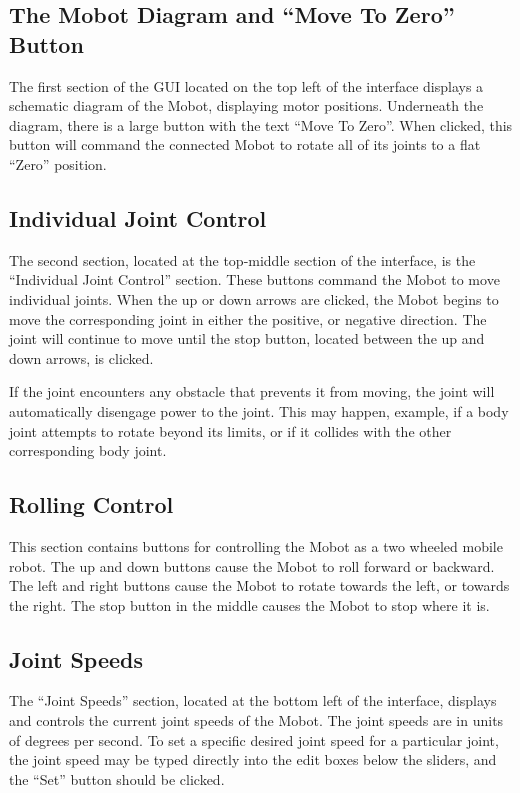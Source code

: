 \documentclass{article}
\begin{document}
\subsection{The Mobot Diagram and ``Move To Zero'' Button}
The first section of the GUI located on the top left of the interface
displays a schematic diagram of the Mobot, displaying motor positions.
Underneath the diagram, there is a large button with the text 
``Move To Zero''. When clicked, this button will command the connected
Mobot to rotate all of its joints to a flat ``Zero'' position.

\subsection{Individual Joint Control}
The second section, located at the top-middle section of the interface,
is the ``Individual Joint Control'' section. These buttons command the
Mobot to move individual joints. When the up or down arrows are clicked,
the Mobot begins to move the corresponding joint in either the positive,
or negative direction. The joint will continue to move until the stop 
button, located between the up and down arrows, is clicked. 

If the joint encounters any obstacle that prevents it from moving, the 
joint will automatically disengage power to the joint. This may happen, 
example, if a body joint attempts to rotate beyond its limits,
or if it collides with the other corresponding body joint. 

\subsection{Rolling Control}
This section contains buttons for controlling the Mobot as a 
two wheeled mobile robot. The up and down buttons cause the Mobot to
roll forward or backward. The left and right buttons cause the Mobot 
to rotate towards the left, or towards the right. The stop button in the
middle causes the Mobot to stop where it is.

\subsection{Joint Speeds}
The ``Joint Speeds'' section, located at the bottom left of the interface,
displays and controls the current joint speeds of the Mobot.
The joint speeds are in units of degrees per second. To set a specific 
desired joint speed for a particular joint, the joint speed may be 
typed directly into the edit boxes below the sliders, and the ``Set''
button should be clicked.
 
\end{document}
